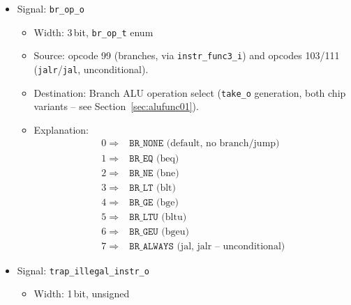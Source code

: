 \begin{itemize}
\begin{itemize}
\[\begin{array}{ll}
                                              12 \Rightarrow & \texttt{ALU\_SLLW} \\
                                              13 \Rightarrow & \texttt{ALU\_SRLW} \\
                                              14 \Rightarrow & \texttt{ALU\_SRAW}
                                              \end{array} \]
  \end{itemize}
  \item Signal: \texttt{br\_op\_o}
  \begin{itemize}
    \item Width: 3\,bit, \texttt{br\_op\_t} enum
    \item Source: opcode 99 (branches, via \texttt{instr\_func3\_i}) and
      opcodes 103/111 (\texttt{jalr}/\texttt{jal}, unconditional).
    \item Destination: Branch ALU operation select (\texttt{take\_o}
      generation, both chip variants -- see Section~\ref{sec:alufunc01}).
    \item Explanation: \[ \begin{array}{ll}
                                              0 \Rightarrow & \texttt{BR\_NONE} \mbox{ (default, no branch/jump)} \\
                                              1 \Rightarrow & \texttt{BR\_EQ} \mbox{ (beq)} \\
                                              2 \Rightarrow & \texttt{BR\_NE} \mbox{ (bne)} \\
                                              3 \Rightarrow & \texttt{BR\_LT} \mbox{ (blt)} \\
                                              4 \Rightarrow & \texttt{BR\_GE} \mbox{ (bge)} \\
                                              5 \Rightarrow & \texttt{BR\_LTU} \mbox{ (bltu)} \\
                                              6 \Rightarrow & \texttt{BR\_GEU} \mbox{ (bgeu)} \\
                                              7 \Rightarrow & \texttt{BR\_ALWAYS} \mbox{ (jal, jalr -- unconditional)}
                                              \end{array} \]
  \end{itemize}
  \item Signal: \texttt{trap\_illegal\_instr\_o}
  \begin{itemize}
    \item Width: 1\,bit, unsigned

\end{itemize}
\end{itemize}
